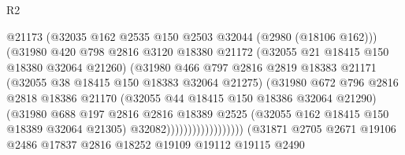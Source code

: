 \begin{lexlean}{R2}
\begin{coremodule}
                                          @21173
                                          (@32035
                                            @162
                                            @2535
                                            @150
                                            @2503
                                            @32044
                                            (@2980 (@18106 @162)))
                                          (@31980
                                            @420
                                            @798
                                            @2816
                                            @3120
                                            @18380
                                            @21172
                                            (@32055 @21 @18415 @150 @18380 @32064 @21260)
                                            (@31980
                                              @466
                                              @797
                                              @2816
                                              @2819
                                              @18383
                                              @21171
                                              (@32055 @38 @18415 @150 @18383 @32064 @21275)
                                              (@31980
                                                @672
                                                @796
                                                @2816
                                                @2818
                                                @18386
                                                @21170
                                                (@32055 @44 @18415 @150 @18386 @32064 @21290)
                                                (@31980
                                                  @688
                                                  @197
                                                  @2816
                                                  @2816
                                                  @18389
                                                  @2525
                                                  (@32055 @162 @18415 @150 @18389 @32064 @21305)
                                                  @32082))))))))))))))))))
              (@31871
                @2705
                @2671
                @19106
                @2486
                @17837
                @2816
                @18252
                @19109
                @19112
                @19115
                @2490

\end{coremodule}
\end{lexlean}
